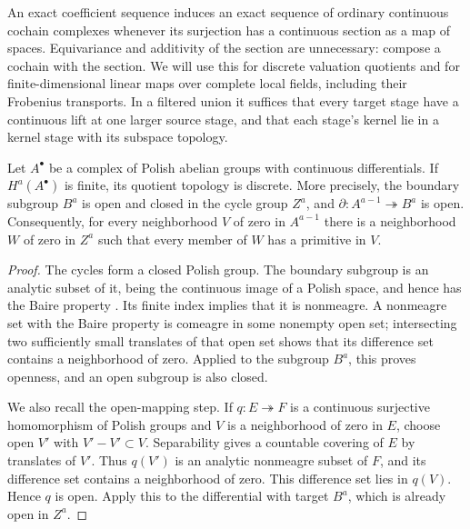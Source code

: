 An exact coefficient sequence induces an exact sequence of ordinary
continuous cochain complexes whenever its surjection has a continuous
section as a map of spaces.  Equivariance and additivity of the section
are unnecessary: compose a cochain with the section.  We will use this
for discrete valuation quotients and for finite-dimensional linear maps
over complete local fields, including their Frobenius transports.  In a
filtered union it suffices that every target stage have a continuous
lift at one larger source stage, and that each stage's kernel lie in a
kernel stage with its subspace topology.

\begin{lemma}[Strictness]\label{h3:co:strictness}
Let $A^\bullet$ be a complex of Polish abelian groups with continuous
differentials.  If $H^a(A^\bullet)$ is finite, its quotient topology is
discrete.  More precisely, the boundary subgroup $B^a$ is open and closed
in the cycle group $Z^a$, and
$\partial:A^{a-1}\twoheadrightarrow B^a$ is open.  Consequently, for
every neighborhood $V$ of zero in $A^{a-1}$ there is a neighborhood $W$
of zero in $Z^a$ such that every member of $W$ has a primitive in $V$.
\end{lemma}

\begin{proof}
The cycles form a closed Polish group.  The boundary subgroup is an
analytic subset of it, being the continuous image of a Polish space,
and hence has the Baire property \cite[Theorem~21.6]{Kechris}.
Its finite index implies that it is nonmeagre.  A nonmeagre set with the
Baire property is comeagre in some nonempty open set; intersecting two
sufficiently small translates of that open set shows that its difference
set contains a neighborhood of zero.  Applied to the subgroup $B^a$,
this proves openness, and an open subgroup is also closed.

We also recall the open-mapping step.  If $q:E\twoheadrightarrow F$ is
a continuous surjective homomorphism of Polish groups and $V$ is a
neighborhood of zero in $E$, choose open $V'$ with $V'-V'\subset V$.
Separability gives a countable covering of $E$ by translates of $V'$.
Thus $q(V')$ is an analytic nonmeagre subset of $F$, and its difference
set contains a neighborhood of zero.  This difference set lies in
$q(V)$.  Hence $q$ is open.  Apply this to the differential with target
$B^a$, which is already open in $Z^a$.
\end{proof}

